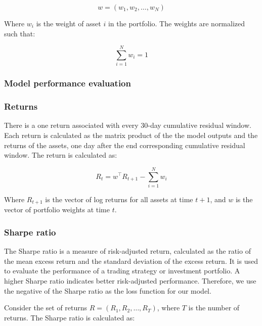 \documentclass[12pt]{article}
\begin{document}
\begin{equation}
    w = (w_1, w_2, \ldots, w_N)
    \label{eq:portfolio_weights}
\end{equation}

Where $w_i$ is the weight of asset $i$ in the portfolio. The weights are normalized such that:

\begin{equation}
    \sum_{i=1}^{N} w_i = 1
    \label{eq:portfolio_weights_normalization}
\end{equation}

\subsubsection{Model performance evaluation} 

\subsubsection*{Returns}

There is a one return associated with every 30-day cumulative residual window. Each return is calculated as the matrix product of the the model outputs and the returns of the assets, one day after the end corresponding cumulative residual window. The return is calculated as:

\begin{equation}
    R_t = w^\top R_{t+1} - \sum_{i=1}^{N} w_i
    \label{eq:returns}
\end{equation}

Where $R_{t+1}$ is the vector of log returns for all assets at time $t+1$, and $w$ is the vector of portfolio weights at time $t$. 

\subsubsection*{Sharpe ratio}

The Sharpe ratio is a measure of risk-adjusted return, calculated as the ratio of the mean excess return and the standard deviation of the excess return. It is used to evaluate the performance of a trading strategy or investment portfolio. A higher Sharpe ratio indicates better risk-adjusted performance. Therefore, we use the negative of the Sharpe ratio as the loss function for our model. 

Consider the set of returns $R = (R_1, R_2, \ldots, R_T)$, where $T$ is the number of returns. The Sharpe ratio is calculated as:
\end{document}
